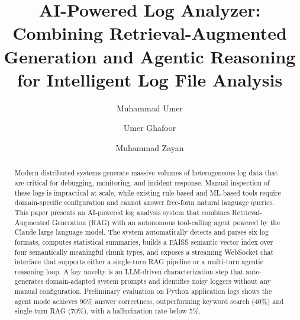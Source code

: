 \documentclass[runningheads]{llncs}
\begin{document}
\title{AI-Powered Log Analyzer: Combining Retrieval-Augmented Generation
and Agentic Reasoning for Intelligent Log File Analysis}


\author{Muhammad Umer \and
Umer Ghafoor \and
Muhammad Zayan}



\maketitle

\begin{abstract}
Modern distributed systems generate massive volumes of heterogeneous log
data that are critical for debugging, monitoring, and incident response.
Manual inspection of these logs is impractical at scale, while existing
rule-based and ML-based tools require domain-specific configuration and
cannot answer free-form natural language queries. This paper presents an
AI-powered log analysis system that combines Retrieval-Augmented Generation
(RAG) with an autonomous tool-calling agent powered by the Claude large
language model. The system automatically detects and parses six log formats,
computes statistical summaries, builds a FAISS semantic vector index over four
semantically meaningful chunk types, and exposes a streaming WebSocket chat
interface that supports either a single-turn RAG pipeline or a multi-turn
agentic reasoning loop. A key novelty is an LLM-driven characterization step
that auto-generates domain-adapted system prompts and identifies noisy loggers
without any manual configuration. Preliminary evaluation on Python application
logs shows the agent mode achieves 90\% answer correctness, outperforming
keyword search (40\%) and single-turn RAG (70\%), with a hallucination rate
below 5\%.

\end{abstract}

\end{document}
